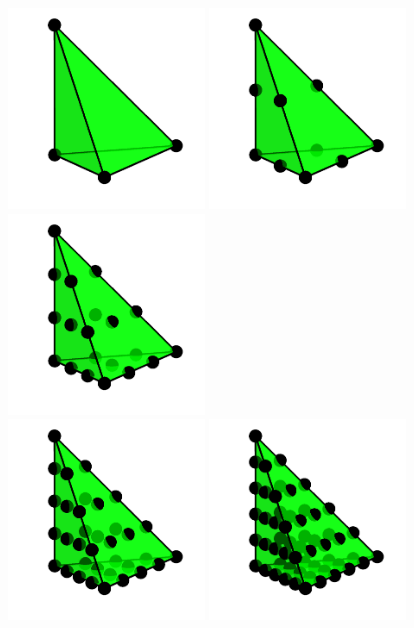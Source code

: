 \begin{figure}
  \begin{center}
    \includegraphics[width=5.2cm]{chapters/kirby-6/png/CG1_3d.png}
    \includegraphics[width=5.2cm]{chapters/kirby-6/png/CG2_3d.png}
    \includegraphics[width=5.2cm]{chapters/kirby-6/png/CG3_3d.png} \\
    \includegraphics[width=5.2cm]{chapters/kirby-6/png/CG4_3d.png}
    \includegraphics[width=5.2cm]{chapters/kirby-6/png/CG5_3d.png}

\end{center}
\end{figure}
